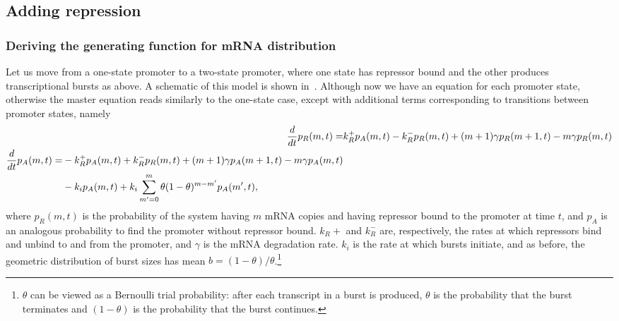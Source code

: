 \subsection{Adding repression}
\subsubsection{Deriving the generating function for mRNA distribution}

Let us move from a one-state promoter to a two-state promoter, where one state
has repressor bound and the other produces transcriptional bursts as above.
A schematic of this model is shown in~.
Although now we have an equation for each promoter state, otherwise
the master equation reads similarly to the one-state case, except with
additional terms corresponding to transitions between promoter states, namely
\begin{align}
\frac{d {}}{d t}p_R(m,t) =& k_R^+ p_A(m,t) - k_R^- p_R(m,t)
        + (m+1)\gamma p_R(m+1,t) - m\gamma p_R(m,t)
\\
\begin{split}
\frac{d {}}{d t}p_A(m,t) =& - k_R^+ p_A(m,t) + k_R^- p_R(m,t)
        + (m+1)\gamma p_A(m+1,t) - m\gamma p_A(m,t) 
\\
&- k_i p_A(m,t) + k_i \sum_{m^\prime=0}^m \theta(1-\theta)^{m-m^\prime} p_A(m^\prime,t),
\end{split}
\end{align}
where $p_R(m,t)$ is the probability of the system having $m$ mRNA copies
and having repressor bound to the promoter at time $t$, and $p_A$ is an
analogous probability to find the promoter without repressor bound.
$k_R+$ and $k_R^-$ are, respectively, the rates at which repressors
bind and unbind to and from the promoter, and
$\gamma$ is the mRNA degradation rate.
$k_i$ is the rate at which bursts initiate, and as before,
the geometric distribution of burst sizes has mean $b=(1-\theta)/\theta$.\footnote{
$\theta$ can be viewed as a Bernoulli trial probability: after each transcript
in a burst is produced, $\theta$ is the probability that the burst
terminates and $(1-\theta)$ is the probability that the burst continues.
}

